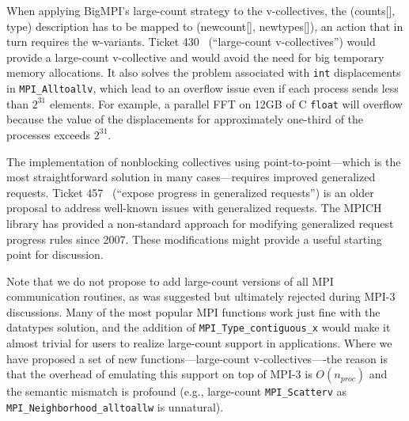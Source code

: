 When applying BigMPI's large-count strategy to the v-collectives, the (counts[], type) description 
has to be mapped to (newcount[], newtypes[]), an action that  in turn requires the w-variants.
Ticket 430~\cite{ticket430}
(``large-count v-collectives'') 
would provide a large-count v-collective and would avoid the need for big temporary memory allocations.
It also solves the problem associated with \texttt{int} displacements in \texttt{MPI\_Alltoallv}, which lead to
an overflow issue even if each process sends less than $2^{31}$ elements.
For example, a parallel FFT on 12GB of C \texttt{float} will overflow because the value of the displacements
for approximately one-third of the processes exceeds $2^{31}$.

The implementation of nonblocking collectives using
point-to-point---which is the most straightforward solution in many
cases---requires improved generalized requests.
Ticket 457~\cite{ticket457} %
(``expose progress in generalized requests'') is an older proposal to address well-known
issues with generalized requests.  The MPICH library has provided a
non-standard approach for modifying generalized request progress rules since 2007.  These modifications might provide a useful starting point
for discussion.


Note that we do not propose to add large-count versions of all MPI communication routines,
as was suggested but ultimately rejected during MPI-3 discussions.
Many of the most popular MPI functions work just fine with the datatypes solution, and
the addition of \texttt{MPI\_Type\_contiguous\_x} would make it almost trivial for users to
realize large-count support in applications.
Where we have proposed a set of new functions---large-count
v-collectives----the reason is that
the overhead of emulating this support on top of MPI-3 is $O(n_{proc})$ and the semantic mismatch is
profound (e.g., large-count \texttt{MPI\_Scatterv} as \texttt{MPI\_Neighborhood\_alltoallw} is unnatural).

